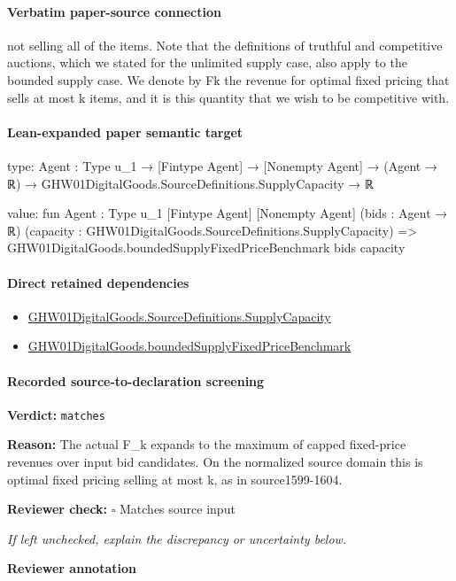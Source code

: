 \documentclass[10pt]{article}
\newcommand{\reviewerbox}{%
  \par\noindent\fbox{\parbox{0.96\linewidth}{\rule{0pt}{0.38in}}}\par
}
\newcommand{\reviewmatch}[1]{%
  \par\noindent\textbf{Reviewer check:} $\square$\; #1\par
  \noindent\emph{If left unchecked, explain the discrepancy or uncertainty below.}\par
}
\begin{document}
\paragraph{Verbatim paper-source connection}
\begin{ReviewVerbatim}
not selling all of the items. Note that the definitions of truthful and competitive auctions, which we
stated for the unlimited supply case, also apply to the
bounded supply case. We denote by Fk the revenue
for optimal fixed pricing that sells at most k items,
and it is this quantity that we wish to be competitive
with.
\end{ReviewVerbatim}



\paragraph{Lean-expanded paper semantic target}
\begin{ReviewVerbatim}
type:
{Agent : Type u_1} →
  [Fintype Agent] → [Nonempty Agent] → (Agent → ℝ) → GHW01DigitalGoods.SourceDefinitions.SupplyCapacity → ℝ

value:
fun {Agent : Type u_1} [Fintype Agent] [Nonempty Agent] (bids : Agent → ℝ)
    (capacity : GHW01DigitalGoods.SourceDefinitions.SupplyCapacity) =>
  GHW01DigitalGoods.boundedSupplyFixedPriceBenchmark bids capacity
\end{ReviewVerbatim}

\paragraph{Direct retained dependencies}
\begin{itemize}\raggedright
\item \hyperlink{governing-declaration-b45673e2f2fa9536}{GHW01\allowbreak{}Digital\allowbreak{}Goods.\allowbreak{}Source\allowbreak{}Definitions.\allowbreak{}Supply\allowbreak{}Capacity}
\item \hyperlink{governing-declaration-2ecd634876367112}{GHW01\allowbreak{}Digital\allowbreak{}Goods.\allowbreak{}bounded\allowbreak{}Supply\allowbreak{}Fixed\allowbreak{}Price\allowbreak{}Benchmark}
\end{itemize}
\paragraph{Recorded source-to-declaration screening}
\textbf{Verdict:} \texttt{matches}
\\
{\raggedright
\textbf{Reason:} The actual F\_\allowbreak{}k expands to the maximum of capped fixed-\allowbreak{}price revenues over input bid candidates.\allowbreak{} On the normalized source domain this is optimal fixed pricing selling at most k, as in source1599-\allowbreak{}1604.\allowbreak{}
\par}
\reviewmatch{Matches source input}
\noindent\textbf{Reviewer annotation}\par
\reviewerbox
\clearpage
\hypertarget{paper-prerequisite-28efc6f30b31d0f1}{}
\end{document}
